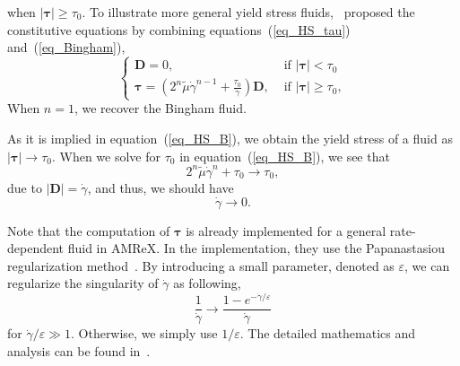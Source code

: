   when $|\bm{\tau}| \geq \tau_0$.
  To illustrate more general yield stress fluids,~\cite{sverdrup_highly_2018} proposed the constitutive equations by combining equations~(\ref{eq_HS_tau}) and~(\ref{eq_Bingham}),
  \begin{equation}
    \left\{\begin{matrix}
  {\bm D }=0, 
    & \text { if } |{\bm \tau}| < \tau_0 
    \\
    {\bm \tau}  =
    \left(2^n \tilde{\mu} \dot{\gamma}^{n-1} + \frac{\tau_0}{ \dot{\gamma}}\right) {\bm D}, 
    & \text { if } |{\bm \tau}|  \geq \tau_0,
  \end{matrix}\right. 
  \label{eq_HS_B}
   \end{equation}
When $n = 1$, we recover the Bingham fluid.
\par
As it is implied in equation~(\ref{eq_HS_B}), we obtain the yield stress of a fluid as $|\bm{\tau}| \rightarrow \tau_0$. 
When we solve for $\tau_0$ in equation~(\ref{eq_HS_B}), we see that 
\begin{equation}
2^n \tilde{\mu} \dot{\gamma}^{n} + \tau_0
\rightarrow \tau_0,
\end{equation}
due to $|\bm{D}| = \dot{\gamma}$, and thus, we should have 
\begin{equation}
  \dot{\gamma} \rightarrow 0.
\end{equation}
\par
Note that the computation of $\bm{\tau}$ is already implemented for a general rate-dependent fluid in AMReX. In the implementation, they use the Papanastasiou regularization method~\cite{papanastasiou_flows_1987}.
By introducing a small parameter, denoted as $\varepsilon$, we can regularize the singularity of $\dot{\gamma}$ as following,
\begin{equation}
  \frac{1}{\dot{\gamma}} \rightarrow \frac{1-e^{-\dot{\gamma} / \varepsilon}}{\dot{\gamma}}  
\end{equation}
for $\dot{\gamma}/\varepsilon \gg 1$. Otherwise, we simply use $1/\varepsilon$. 
The detailed mathematics and analysis can be found in~\cite{sverdrup_highly_2018}.




